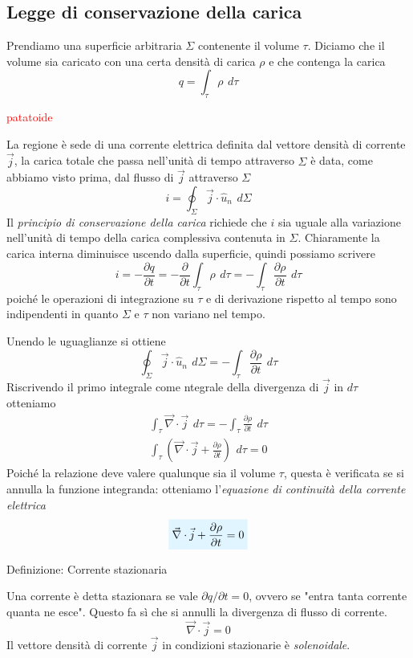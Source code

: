 \documentclass[x11names]{report}
\newcommand{\definizione}[2]{
	\begin{center}
		\fboxsep11pt
		\colorbox{myblue}{\begin{minipage}{5.75in}
				\begin{blues}{Definizione: #1}
					#2
				\end{blues}
		\end{minipage}}
	\end{center}
}
\newcommand{\viola}[1]{%
	\colorbox{myblue}{$\displaystyle #1$}
}
\begin{document}
\subsection{Legge di conservazione della carica}
Prendiamo una superficie arbitraria \(\Sigma\) contenente il volume \(\tau\). Diciamo che il volume sia caricato con una certa densità di carica \(\rho\) e che contenga la carica
\[
q = \int_\tau \rho \,\ d\tau
\]
\begin{center}
	\textcolor{red}{patatoide}
\end{center}
La regione è sede di una corrente elettrica definita dal vettore densità di corrente \(\vec{j}\), la carica totale che passa nell'unità di tempo attraverso \(\Sigma\) è data, come abbiamo visto prima, dal flusso di \(\vec{j}\) attraverso \(\Sigma\)
\[
i = \oint_{\Sigma} \vec{j}\cdot \hat{u}_n \,\ d\Sigma
\]
Il \textit{principio di conservazione della carica} richiede che \(i\) sia uguale alla variazione nell'unità di tempo della carica complessiva contenuta in \(\Sigma\). Chiaramente la carica interna diminuisce uscendo dalla superficie, quindi possiamo scrivere
\[
i = - \frac{\partial q}{\partial t} = -\frac{\partial}{\partial t}\int_\tau \rho \,\ d\tau = -\int_\tau \frac{\partial\rho}{\partial t} \,\ d\tau
\]
poiché le operazioni di integrazione su \(\tau\) e di derivazione rispetto al tempo sono indipendenti in quanto \(\Sigma\) e \(\tau\) non variano nel tempo.

Unendo le uguaglianze si ottiene
\[
\oint_{\Sigma} \vec{j}\cdot \hat{u}_n \,\ d\Sigma = -\int_\tau \frac{\partial\rho}{\partial t} \,\ d\tau
\]
Riscrivendo il primo integrale come ntegrale della divergenza di \(\vec{j}\) in \(d\tau\) otteniamo
\begin{gather}
	\int_\tau \vec{\nabla} \cdot \vec{j} \,\ d\tau = - \int_\tau \frac{\partial\rho}{\partial t} \,\ d\tau \\
	\int_\tau \left(\vec{\nabla} \cdot \vec{j} + \frac{\partial\rho}{\partial t}\right)\,\ d\tau = 0
\end{gather}
Poiché la relazione deve valere qualunque sia il volume \(\tau\), questa è verificata se si annulla la funzione integranda: otteniamo l'\textit{equazione di continuità della corrente elettrica}
\begin{equation}
	\viola{\vec{\nabla} \cdot \vec{j} + \frac{\partial\rho}{\partial t} = 0}
\end{equation}
\definizione{Corrente stazionaria}{
Una corrente è detta stazionara se vale \(\partial q/\partial t = 0\), ovvero se "entra tanta corrente quanta ne esce". Questo fa sì che si annulli la divergenza di flusso di corrente.
\begin{equation}
	\vec{\nabla} \cdot \vec{j} = 0
\end{equation}
Il vettore densità di corrente \(\vec{j}\) in condizioni stazionarie è \textit{solenoidale}.
}
\end{document}
